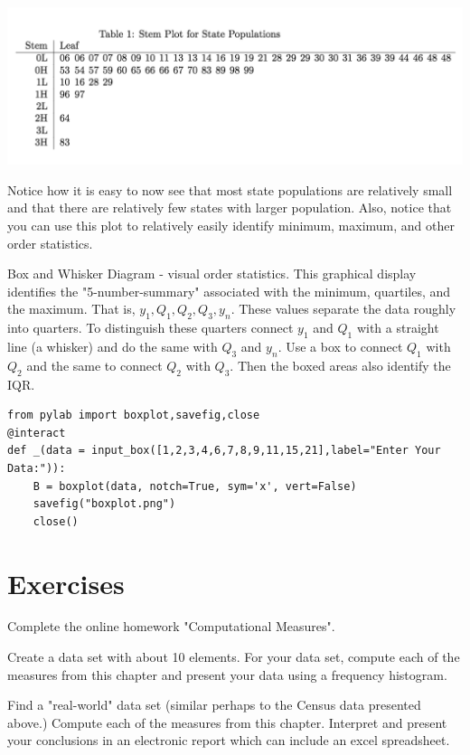 \documentclass[10pt,]{book}
\theoremstyle{plain}
\theoremstyle{definition}
\theoremstyle{definition}
\theoremstyle{definition}
\numberwithin{equation}{section}
\begin{document}
		
\includegraphics[width=1\linewidth]{images/stemandleaf.png}


Notice how it is easy to now see that most state populations are relatively small and that there are relatively few states with larger population. Also, notice that you can use this plot to relatively easily identify minimum, maximum, and other order statistics.		
		
\par
Box and Whisker Diagram - visual order statistics. This graphical display identifies the "5-number-summary" associated with the minimum, quartiles, and the maximum. That is, \(y_1, Q_1, Q_2, Q_3, y_n\).  These values separate the data roughly into quarters. To distinguish these quarters connect \(y_1\) and \(Q_1\) with a straight line (a whisker) and do the same with \(Q_3\) and \(y_n\). Use a box to connect \(Q_1\) with \(Q_2\) and the same to connect \(Q_2\) with \(Q_3\). Then the boxed areas also identify the IQR.    
\begin{lstlisting}[style=sageinput]
from pylab import boxplot,savefig,close
@interact
def _(data = input_box([1,2,3,4,6,7,8,9,11,15,21],label="Enter Your Data:")):
    B = boxplot(data, notch=True, sym='x', vert=False)
    savefig("boxplot.png")
    close()
\end{lstlisting}

\typeout{************************************************}
\typeout{************************************************}
\section[Exercises]{Exercises}\label{section-12}
Complete the online homework "Computational Measures".%
\par
Create a data set with about 10 elements. For your data set, compute each of the measures from this chapter and present your data using a frequency histogram.%
\par
Find a "real-world" data set (similar perhaps to the Census data presented above.) Compute each of the measures from this chapter. Interpret and present your conclusions in an electronic report which can include an excel spreadsheet.%
\typeout{************************************************}
\typeout{************************************************}
\end{document}
